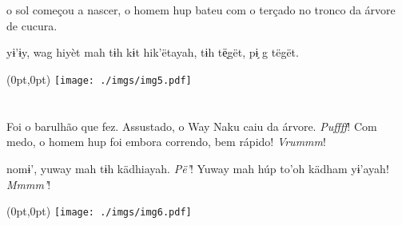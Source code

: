 \chapter*{}

\mbox{}\vspace*{\fill}

 o sol
começou a nascer,
o homem hup bateu
com o terçado no
tronco da árvore
de cucura.

\vspace{2em}

 yɨ’ɨy, wag
hiyèt mah tɨh kɨt
hik’ëtayah, tɨh
të̖gët, pɨ̗ g tëgët.

\vspace*{\fill}

\pagebreak

\begin{textblock*}{8in}(0pt,0pt)%
\vspace*{-2.8cm}
\hspace*{-3.2cm}\texttt{[image: ./imgs/img5.pdf]}
\end{textblock*}

\chapter*{}

\mbox{}\vspace*{\fill}

 Foi o barulhão
que fez. Assustado,
o Way Naku caiu da
árvore. \textit{Puffff}!
Com medo, o homem
hup foi embora
correndo, bem
rápido! \textit{Vrummm}!

\vspace{2em}

 nomɨ’, yuway
mah tɨh kädhiayah.
\textit{Pë’}! Yuway mah
húp to’oh kädham
yɨ’ayah! \textit{Mmmm’}!

\vspace*{\fill}

\pagebreak

\begin{textblock*}{8in}(0pt,0pt)%
\vspace*{-2.8cm}
\hspace*{-3.2cm}\texttt{[image: ./imgs/img6.pdf]}
\end{textblock*}

\chapter*{}

